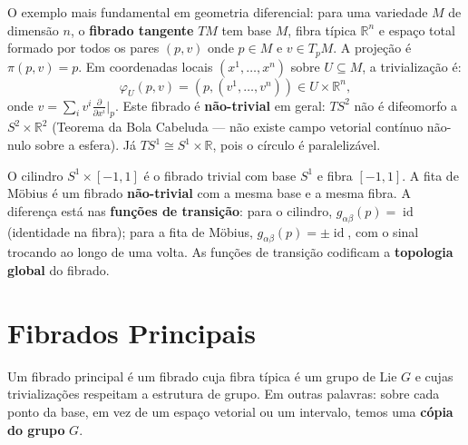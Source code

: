 \begin{ex}\label{ex:tangente}
O exemplo mais fundamental em geometria diferencial: para uma variedade $M$ de
dimens\~ao $n$, o \textbf{fibrado tangente} $TM$ tem base $M$, fibra t\'ipica
$\mathbb{R}^n$ e espa\c{c}o total formado por todos os pares $(p, v)$ onde
$p \in M$ e $v \in T_pM$. A proje\c{c}\~ao \'e $\pi(p, v) = p$. Em
coordenadas locais $(x^1, \dots, x^n)$ sobre $U \subseteq M$, a
trivializa\c{c}\~ao \'e:
\begin{equation}
 \varphi_U(p, v) = (p, (v^1, \dots, v^n)) \in U \times \mathbb{R}^n,
\end{equation}
onde $v = \sum_i v^i \frac{\partial}{\partial x^i}\big|_p$. Este fibrado \'e
\textbf{n\~ao-trivial} em geral: $TS^2$ n\~ao \'e difeomorfo a
$S^2 \times \mathbb{R}^2$ (Teorema da Bola Cabeluda --- n\~ao existe campo
vetorial cont\'inuo n\~ao-nulo sobre a esfera). J\'a $TS^1 \cong
S^1 \times \mathbb{R}$, pois o c\'irculo \'e paraleliz\'avel.
\end{ex}

\begin{ex}
O cilindro $S^1 \times [-1,1]$ \'e o fibrado trivial com base $S^1$ e fibra
$[-1,1]$. A fita de M\"obius \'e um fibrado \textbf{n\~ao-trivial} com a mesma
base e a mesma fibra. A diferen\c{c}a est\'a nas \textbf{fun\c{c}\~oes de
transi\c{c}\~ao}: para o cilindro, $g_{\alpha\beta}(p) = \operatorname{id}$
(identidade na fibra); para a fita de M\"obius,
$g_{\alpha\beta}(p) = \pm \operatorname{id}$, com o sinal trocando ao longo
de uma volta. As fun\c{c}\~oes de transi\c{c}\~ao codificam a
\textbf{topologia global} do fibrado.
\end{ex}

\section{Fibrados Principais}

Um fibrado principal \'e um fibrado cuja fibra t\'ipica \'e um grupo de Lie $G$
e cujas trivializa\c{c}\~oes respeitam a estrutura de grupo. Em outras palavras:
sobre cada ponto da base, em vez de um espa\c{c}o vetorial ou um intervalo,
temos uma \textbf{c\'opia do grupo} $G$.

